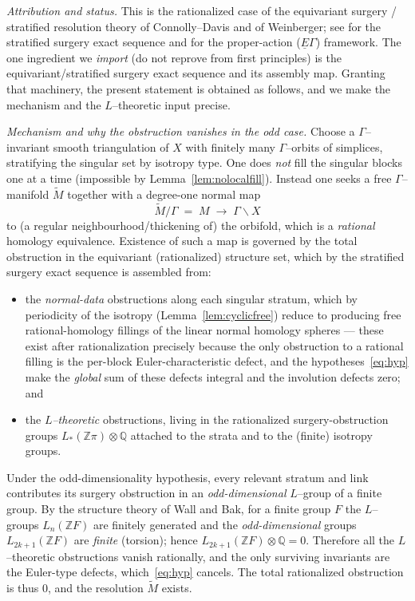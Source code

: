 \documentclass[12pt]{article}
\newcommand{\bQ}{\mathbb{Q}}
\newcommand{\bZ}{\mathbb{Z}}
\theoremstyle{definition}
\begin{document}
\noindent\emph{Attribution and status.}  This is the rationalized case of the
equivariant surgery / stratified resolution theory of Connolly--Davis and of
Weinberger; see \cite[Chs.~II, V]{Weinberger} for the stratified surgery exact
sequence and \cite{Lueck} for the proper-action ($\underline E\Gamma$) framework.
The one ingredient we \emph{import} (do not reprove from first principles) is the
equivariant/stratified surgery exact sequence and its assembly map.  Granting
that machinery, the present statement is obtained as follows, and we make the
mechanism and the $L$--theoretic input precise.

\medskip
\noindent\emph{Mechanism and why the obstruction vanishes in the odd case.}
Choose a $\Gamma$--invariant smooth triangulation of $X$ with finitely many
$\Gamma$--orbits of simplices, stratifying the singular set by isotropy type.  One
does \emph{not} fill the singular blocks one at a time (impossible by
Lemma~\ref{lem:nolocalfill}).  Instead one seeks a free $\Gamma$--manifold
$\widetilde M$ together with a degree-one normal map
\[
   \widetilde M/\Gamma \;=\; M \;\longrightarrow\; \Gamma\backslash X
\]
to (a regular neighbourhood/thickening of) the orbifold, which is a
\emph{rational} homology equivalence.  Existence of such a map is governed by the
total obstruction in the equivariant (rationalized) structure set, which by the
stratified surgery exact sequence is assembled from:
\begin{itemize}
\item the \emph{normal-data} obstructions along each singular stratum, which by
periodicity of the isotropy (Lemma~\ref{lem:cyclicfree}) reduce to producing free
rational-homology fillings of the linear normal homology spheres --- these exist
after rationalization precisely because the only obstruction to a rational filling
is the per-block Euler-characteristic defect, and the hypotheses~\eqref{eq:hyp}
make the \emph{global} sum of these defects integral and the involution defects
zero; and
\item the \emph{$L$--theoretic} obstructions, living in the rationalized
surgery-obstruction groups $L_{*}(\bZ\pi)\otimes\bQ$ attached to the strata and
to the (finite) isotropy groups.
\end{itemize}
Under the odd-dimensionality hypothesis, every relevant stratum and link
contributes its surgery obstruction in an \emph{odd-dimensional} $L$--group of a
finite group.  By the structure theory of Wall and Bak, for a finite group $F$ the
$L$--groups $L_n(\bZ F)$ are finitely generated and the \emph{odd-dimensional}
groups $L_{2k+1}(\bZ F)$ are \emph{finite} \textup{(}torsion\textup{)}; hence
$L_{2k+1}(\bZ F)\otimes\bQ=0$.  Therefore all the $L$--theoretic obstructions
vanish rationally, and the only surviving invariants are the Euler-type defects,
which~\eqref{eq:hyp} cancels.  The total rationalized obstruction is thus $0$, and
the resolution $\widetilde M$ exists.
\end{document}
